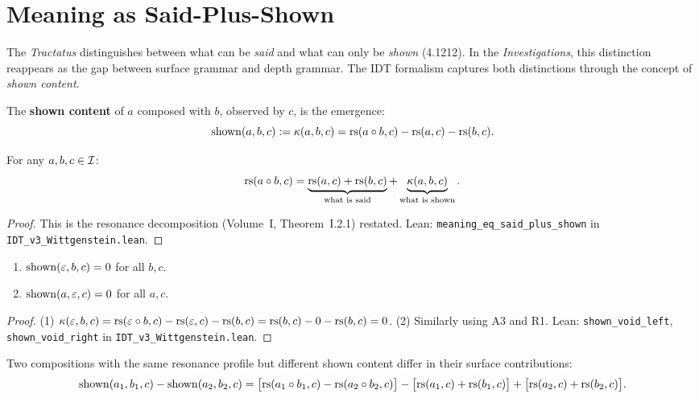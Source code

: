 \section{Meaning as Said-Plus-Shown}

The \textit{Tractatus} distinguishes between what can be \emph{said} and what
can only be \emph{shown} (4.1212). In the \textit{Investigations}, this
distinction reappears as the gap between surface grammar and depth grammar.
The IDT formalism captures both distinctions through the concept of
\emph{shown content}.

\begin{definition}
The \textbf{shown content} of $a$ composed with $b$, observed by $c$, is
the emergence:
\[
\mathrm{shown}(a, b, c) := \kappa(a, b, c) = \mathrm{rs}(a \circ b, c) - \mathrm{rs}(a, c) - \mathrm{rs}(b, c).
\]
\end{definition}

\begin{theorem}
\label{thm:said-plus-shown}
For any $a, b, c \in \mathcal{I}$:
\[
\mathrm{rs}(a \circ b, c) = \underbrace{\mathrm{rs}(a, c) + \mathrm{rs}(b, c)}_{\text{what is said}}
+ \underbrace{\kappa(a, b, c)}_{\text{what is shown}}.
\]
\end{theorem}

\begin{proof}
This is the resonance decomposition (Volume~I, Theorem~I.2.1) restated.
Lean: \texttt{meaning\_eq\_said\_plus\_shown} in
\texttt{IDT\_v3\_Wittgenstein.lean}.
\end{proof}

\begin{theorem}
\label{thm:void-shows-nothing}
\begin{enumerate}
\item $\mathrm{shown}(\varepsilon, b, c) = 0$ for all $b, c$.
\item $\mathrm{shown}(a, \varepsilon, c) = 0$ for all $a, c$.
\end{enumerate}
\end{theorem}

\begin{proof}
(1) $\kappa(\varepsilon, b, c) = \mathrm{rs}(\varepsilon \circ b, c) - \mathrm{rs}(\varepsilon, c) - \mathrm{rs}(b,c)
= \mathrm{rs}(b,c) - 0 - \mathrm{rs}(b,c) = 0$. (2) Similarly using A3 and R1.
Lean: \texttt{shown\_void\_left}, \texttt{shown\_void\_right} in
\texttt{IDT\_v3\_Wittgenstein.lean}.
\end{proof}

\begin{theorem}
\label{thm:showing-gap}
Two compositions with the same resonance profile but different shown content
differ in their surface contributions:
\[
\mathrm{shown}(a_1, b_1, c) - \mathrm{shown}(a_2, b_2, c)
= \bigl[\mathrm{rs}(a_1 \circ b_1, c) - \mathrm{rs}(a_2 \circ b_2, c)\bigr]
  - \bigl[\mathrm{rs}(a_1, c) + \mathrm{rs}(b_1, c)\bigr]
  + \bigl[\mathrm{rs}(a_2, c) + \mathrm{rs}(b_2, c)\bigr].
\]
\end{theorem}

